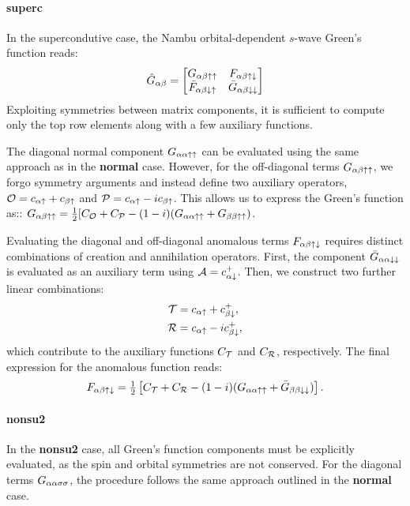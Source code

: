 \documentclass[edipack2.tex]{subfiles}
\begin{document}
\paragraph{{\bf superc}}
In the supercondutive case, the Nambu orbital-dependent $s$-wave
Green's function reads:
\begin{equation}
  \label{GFnambu}
  \hat{G}_{\alpha\beta} =
  \begin{bmatrix}
    G_{\alpha\beta\uparrow\uparrow} & F_{\alpha\beta\uparrow\downarrow} \\
    \bar{F}_{\alpha\beta\downarrow\uparrow} & \bar{G}_{\alpha\beta\downarrow\downarrow}
  \end{bmatrix}  
\end{equation}
Exploiting symmetries between matrix components, it is 
sufficient to compute only the top row elements along with 
a few auxiliary functions.

The diagonal normal component $G_{\alpha\alpha\uparrow\uparrow}$ can be 
evaluated using the same approach as in the {\bf normal} 
case. However, for the off-diagonal terms $G_{\alpha\beta\uparrow\uparrow}$, 
we forgo symmetry arguments and instead define two 
auxiliary operators, ${\cal O} = c_{\alpha\uparrow} + c_{\beta\uparrow}$ and 
${\cal P} = c_{\alpha\uparrow} - i c_{\beta\uparrow}$. This allows us to express 
the Green's function as::
$G_{\alpha\beta\uparrow\uparrow}=\tfrac{1}{2}[C_{\cal O} + C_{\cal P} -
(1-i)(G_{\alpha\alpha\uparrow\uparrow}+G_{\beta\beta\uparrow\uparrow})$.

Evaluating the diagonal and off-diagonal anomalous terms 
$F_{\alpha\beta\uparrow\downarrow}$ requires distinct combinations of 
creation and annihilation operators. First, the component 
$\bar{G}_{\alpha\alpha\downarrow\downarrow}$ is evaluated as an auxiliary term 
using ${\cal A} = c^+_{\alpha\downarrow}$. Then, we construct two further 
linear combinations:
\begin{align*}
{\cal T} &= c_{\alpha\uparrow} + c^+_{\beta\downarrow}, \\
{\cal R} &= c_{\alpha\uparrow} - i c^+_{\beta\downarrow},
\end{align*}
which contribute to the auxiliary functions $C_{\cal T}$ and 
$C_{\cal R}$, respectively. The final expression for the 
anomalous function reads:
\begin{equation}
F_{\alpha\beta\uparrow\downarrow} = \tfrac{1}{2} \left[ C_{\cal T} + C_{\cal R} - 
(1-i)(G_{\alpha\alpha\uparrow\uparrow} + \bar{G}_{\beta\beta\downarrow\downarrow}) \right].
\end{equation}



\paragraph{{\bf nonsu2}}
In the {\bf nonsu2} case, all Green's function components 
must be explicitly evaluated, as the spin and orbital 
symmetries are not conserved. For the diagonal terms 
$G_{\alpha\alpha\sigma\sigma}$, the procedure follows the same approach 
outlined in the {\bf normal} case. 
\end{document}
